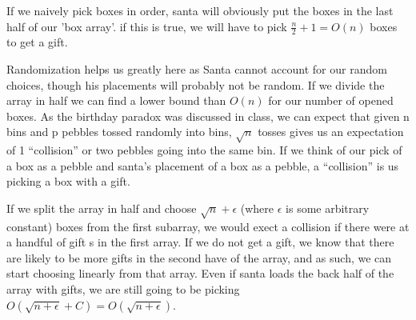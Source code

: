 \documentclass[titlepage]{article}\usepackage[]{graphicx}\usepackage[]{color}
\begin{document}
If we naively pick boxes in order, santa will obviously put the boxes in the
last half of our 'box array'. if this is true, we will have to pick
$\frac{n}{2} + 1 = O(n)$ boxes to get a gift. 

Randomization helps us greatly here as Santa cannot account for our random
choices, though his placements will probably not be random. If we divide the array in half we can find a lower bound than $O(n)$
for our number of opened boxes. 
As the birthday paradox was discussed in class, we can expect that given n bins
and p pebbles tossed randomly into bins, $\sqrt{ n }$ tosses gives us an
expectation of 1 ``collision'' or two pebbles going into the same bin. If we
think of our pick of a box as a pebble and santa's placement of a box as a
pebble, a ``collision'' is us picking a box with a gift. 

If we split the array in half and choose $\sqrt{ n } + \epsilon$ (where
$\epsilon$ is some arbitrary constant) boxes from the
first subarray, we would exect a collision if there were at a handful of gift
s in the first array. If we do not get a gift, we know that there are likely to be
more gifts in the second have of the array, and as such, we can start choosing
linearly from that array. 
Even if santa loads the back half of the array with gifts, we are still going
to be picking $O(\sqrt{n+\epsilon} + C) = O(\sqrt{n+\epsilon})$. 
\end{document}
